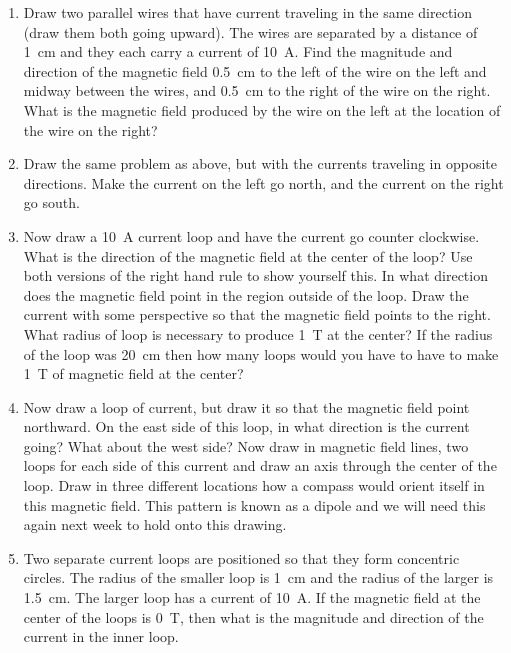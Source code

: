 \begin{enumerate}
\item
Draw two parallel wires that have current traveling in the same direction (draw them both going upward). The wires are separated by a distance of \SI{1}{cm} and they each carry a current of \SI{10}{\ampere}. Find the magnitude and direction of the magnetic field \SI{0.5}{cm} to the left of the wire on the left and midway between the wires, and \SI{0.5}{cm} to the right of the wire on the right. What is the magnetic field produced by the wire on the left at the location of the wire on the right?

\item
Draw the same problem as above, but with the currents traveling in opposite directions. Make the current on the left go north, and the current on the right go south.

\item
Now draw a \SI{10}{\ampere} current loop and have the current go counter clockwise. What is the direction of the magnetic field at the center of the loop? Use both versions of the right hand rule to show yourself this. In what direction does the magnetic field point in the region outside of the loop. Draw the current with some perspective so that the magnetic field points to the right. What radius of loop is necessary to produce \SI{1}{\tesla} at the center? If the radius of the loop was \SI{20}{cm} then how many loops would you have to have to make \SI{1}{\tesla} of magnetic field at the center?

\item
Now draw a loop of current, but draw it so that the magnetic field point northward. On the east side of this loop, in what direction is the current going? What about the west side? Now draw in magnetic field lines, two loops for each side of this current and draw an axis through the center of the loop. Draw in three different locations how a compass would orient itself in this magnetic field. This pattern is known as a dipole and we will need this again next week to hold onto this drawing.

\item
Two separate current loops are positioned so that they form concentric circles. The radius of the smaller loop is \SI{1}{cm} and the radius of the larger is \SI{1.5}{cm}. The larger loop has a current of \SI{10}{\ampere}. If the magnetic field at the center of the loops is \SI{0}{\tesla}, then what is the magnitude and direction of the current in the inner loop.







\newpage 

\ %

\newpage

\end{enumerate}
